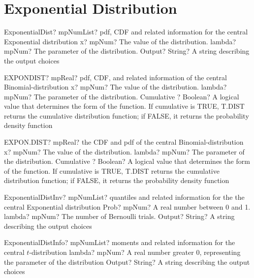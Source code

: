 \documentclass[12pt,a4paper,openany]{book}
\begin{document}
\section{Exponential Distribution}

\begin{mpFunctionsExtract}
\mpFunctionThreeNotImplemented
{ExponentialDist? mpNumList? pdf, CDF and related information for the central Exponential distribution}
{x? mpNum? The value of the distribution.}
{lambda? mpNum? The parameter of the distribution.}
{Output? String? A string describing the output choices}
\end{mpFunctionsExtract}

\begin{mpFunctionsExtract}
\mpWorksheetFunctionThreeNotImplemented
{EXPONDIST? mpReal? pdf, CDF, and related information of the central Binomial-distribution}
{x? mpNum? The value of the distribution.}
{lambda? mpNum? The parameter of the distribution.}
{Cumulative ? Boolean? A logical value that determines the form of the function. If cumulative is TRUE, T.DIST returns the cumulative distribution function; if FALSE, it returns the probability density function}
\end{mpFunctionsExtract}

\begin{mpFunctionsExtract}
\mpWorksheetFunctionThreeNotImplemented
{EXPON.DIST? mpReal? the CDF and pdf of the central Binomial-distribution}
{x? mpNum? The value of the distribution.}
{lambda? mpNum? The parameter of the distribution.}
{Cumulative ? Boolean? A logical value that determines the form of the function. If cumulative is TRUE, T.DIST returns the cumulative distribution function; if FALSE, it returns the probability density function}
\end{mpFunctionsExtract}

\begin{mpFunctionsExtract}
\mpFunctionThreeNotImplemented
{ExponentialDistInv? mpNumList? quantiles and related information for the the central Exponential distribution}
{Prob? mpNum? A real number between 0 and 1.}
{lambda? mpNum? The number of Bernoulli trials.}
{Output? String? A string describing the output choices}
\end{mpFunctionsExtract}

\begin{mpFunctionsExtract}
\mpFunctionTwoNotImplemented
{ExponentialDistInfo? mpNumList? moments and related information for the central $t$-distribution}
{lambda? mpNum? A real number greater 0, representing the parameter of the distribution}
{Output? String? A string describing the output choices}
\end{mpFunctionsExtract}
\end{document}
